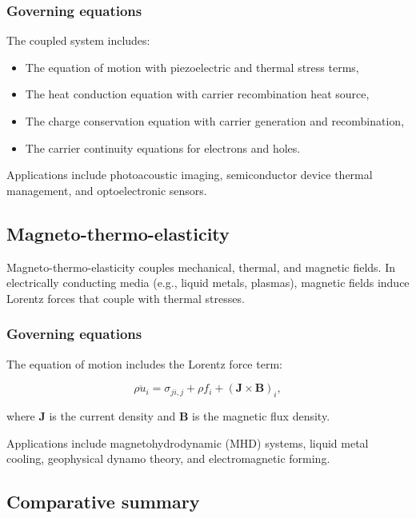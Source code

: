\subsubsection{Governing equations}

The coupled system includes:
\begin{itemize}
\item The equation of motion with piezoelectric and thermal stress terms,
\item The heat conduction equation with carrier recombination heat source,
\item The charge conservation equation with carrier generation and recombination,
\item The carrier continuity equations for electrons and holes.
\end{itemize}

Applications include photoacoustic imaging, semiconductor device thermal management, and optoelectronic sensors.

\subsection{Magneto-thermo-elasticity}
\label{sec:5.7}

Magneto-thermo-elasticity couples mechanical, thermal, and magnetic fields. In electrically conducting media (e.g., liquid metals, plasmas), magnetic fields induce Lorentz forces that couple with thermal stresses.

\subsubsection{Governing equations}

The equation of motion includes the Lorentz force term:

\begin{equation}
\rho\ddot{u}_i = \sigma_{ji,j} + \rho f_i + (\bm{J} \times \bm{B})_i,
\label{eq:5.18}
\end{equation}

where $\bm{J}$ is the current density and $\bm{B}$ is the magnetic flux density.

Applications include magnetohydrodynamic (MHD) systems, liquid metal cooling, geophysical dynamo theory, and electromagnetic forming.

\subsection{Comparative summary}
\label{sec:5.8}

